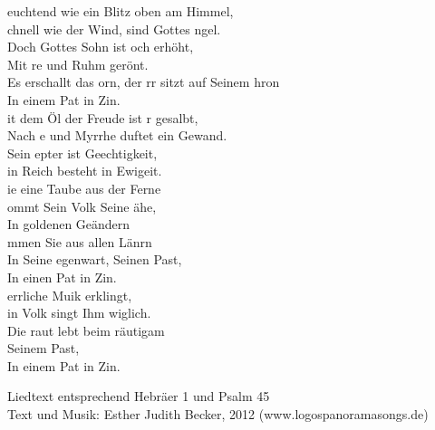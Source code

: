 
euchtend wie ein Blitz oben am Himmel,\\
chnell wie der Wind,  sind Gottes ngel.\\
Doch Gottes Sohn ist och erhöht,\\
Mit re und Ruhm gerönt.\\
Es erschallt das orn, der rr sitzt auf Seinem hron\\
In einem Pat in Zin.\\
it dem Öl der Freude ist r gesalbt,\\
Nach e und Myrrhe duftet ein Gewand.\\
Sein epter ist Geechtigkeit,\\
in Reich besteht in Ewigeit.\\

ie eine Taube aus der Ferne\\
ommt Sein Volk  Seine ähe,\\
In goldenen Geändern \\
mmen Sie aus allen Länrn\\
In Seine egenwart,  Seinen Past,\\
In einen Pat in Zin.\\
errliche Muik erklingt,\\
in Volk singt Ihm wiglich.\\
Die raut lebt beim räutigam\\
 Seinem Past, \\
In einem Pat in Zin.\\

\begin{footnotesize}
Liedtext entsprechend Hebräer 1 und Psalm 45\\
Text und Musik: Esther Judith Becker, 2012 (www.logospanoramasongs.de)
\end{footnotesize}